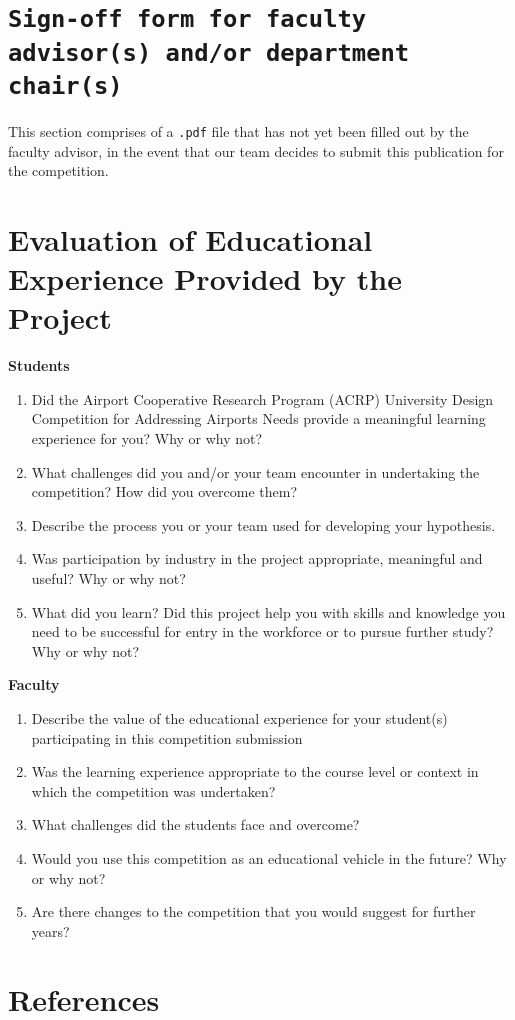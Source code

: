 \documentclass[../main.tex]{subfiles}
\begin{document}
\begin{appendices}
\begin{singlespace}
\section{\texttt{Sign-off form for faculty advisor(s) and/or department chair(s)}}
\noindent  This section comprises of a \texttt{.pdf} file that has not yet been filled out by the faculty advisor, in the event that our team decides to submit this publication for the competition.\par

\newpage
\section{Evaluation of Educational Experience Provided by the Project}\label{apxE}
\noindent\textbf{Students}\newline
\begin{enumerate}
    \item Did the Airport Cooperative Research Program (ACRP) University Design Competition for Addressing Airports Needs provide a meaningful learning experience for you? Why or why not?
    \item What challenges did you and/or your team encounter in undertaking the competition? How did you overcome them?
    \item Describe the process you or your team used for developing your hypothesis.
    \item Was participation by industry in the project appropriate, meaningful and useful? Why or why not?
    \item What did you learn? Did this project help you with skills and knowledge you need to be successful for entry in the workforce or to pursue further study? Why or why not?
\end{enumerate}
\noindent\textbf{Faculty}\newline
\begin{enumerate}
    \item Describe the value of the educational experience for your student(s) participating in this competition submission
    \item Was the learning experience appropriate to the course level or context in which the competition was undertaken?
    \item What challenges did the students face and overcome?
    \item Would you use this competition as an educational vehicle in the future? Why or why not?
    \item Are there changes to the competition that you would suggest for further years?
\end{enumerate}

\newpage
\section{References}\label{apxF}
\printbibliography[heading = none]
\end{singlespace}
\end{appendices}
\end{document}
